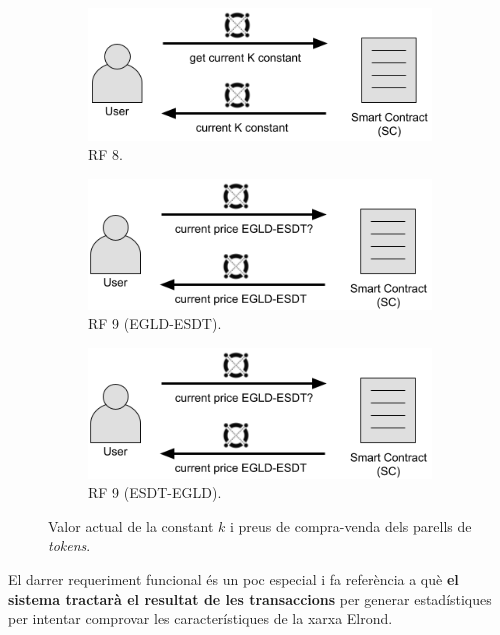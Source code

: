 \documentclass[11pt,a4paper]{article}
\begin{document}
\begin{figure}[!htb]
\begin{subfigure}[b]{0.33\textwidth}
  \includegraphics[width=\linewidth]{cu_k_constant.png}
  \caption{RF 8.}\label{fig:statuspair}
\end{subfigure}\hfill
\begin{subfigure}[b]{0.33\textwidth}
  \includegraphics[width=\linewidth]{cu_current_price_EGLD_ESDT.png}
  \caption{RF 9 (EGLD-ESDT).}\label{fig:price_egld_esdt}
\end{subfigure}\hfill
\begin{subfigure}[b]{0.33\textwidth}
  \includegraphics[width=\linewidth]{cu_current_price_EGLD_ESDT.png}
  \caption{RF 9 (ESDT-EGLD).}\label{fig:price_egld_esdt}
\end{subfigure}\hfill
\caption{Valor actual de la constant \(k\) i preus de compra-venda dels parells de \textit{tokens}.}
\label{fig:RRFF8-9}
\end{figure}

El darrer requeriment funcional és un poc especial i fa referència a què \textbf{el sistema tractarà el resultat de les transaccions} per generar estadístiques per intentar comprovar les característiques de la xarxa Elrond.
\end{document}
